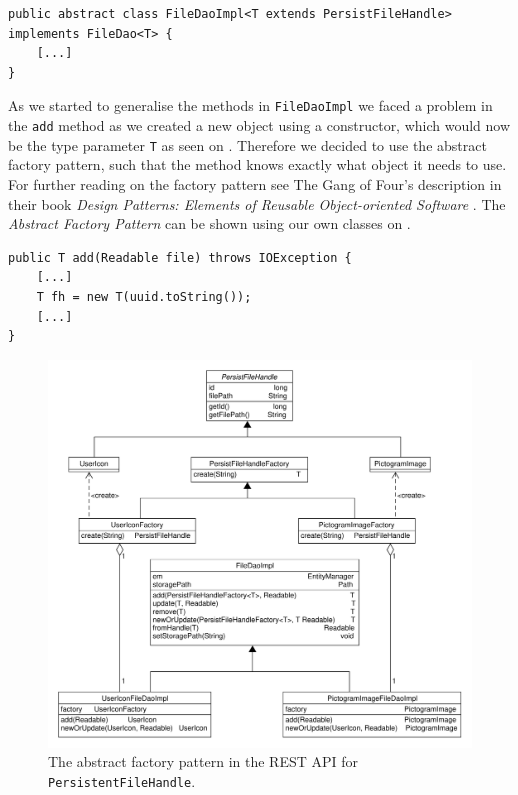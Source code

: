 \begin{lstlisting}[float, floatplacement=h, caption={The \texttt{FileDaoImpl} class header which uses Type Parameters to generalise which types it can be used with. \texttt{[...]} denotes omitted code.},label={lst:typeparameter}]
public abstract class FileDaoImpl<T extends PersistFileHandle> implements FileDao<T> {
    [...]
}
\end{lstlisting}

As we started to generalise the methods in \texttt{FileDaoImpl} we faced a problem in the \texttt{add} method as we created a new object using a constructor, which would now be the type parameter \texttt{T} as seen on .
Therefore we decided to use the abstract factory pattern, such that the method knows exactly what object it needs to use.
For further reading on the factory pattern see The Gang of Four's description in their book \textit{Design Patterns: Elements of Reusable Object-oriented Software} \cite{abstractfactorypattern}.
The \textit{Abstract Factory Pattern} can be shown using our own classes on .

\begin{lstlisting}[float, floatplacement=h, caption={Trying to use a Type Parameter constructor, which Java cannot do. \texttt{[...]} denotes omitted code.},label={lst:TypeParameterConstructor}]
public T add(Readable file) throws IOException {
    [...]
    T fh = new T(uuid.toString());
    [...]
}
\end{lstlisting}

\begin{figure}[h]
    \centering
    \includegraphics[width=\textwidth]{figures/factorymodel.pdf}
    \caption{The abstract factory pattern in the REST API for \texttt{PersistentFileHandle}.}\label{fig:asbtractFactory}
\end{figure}

